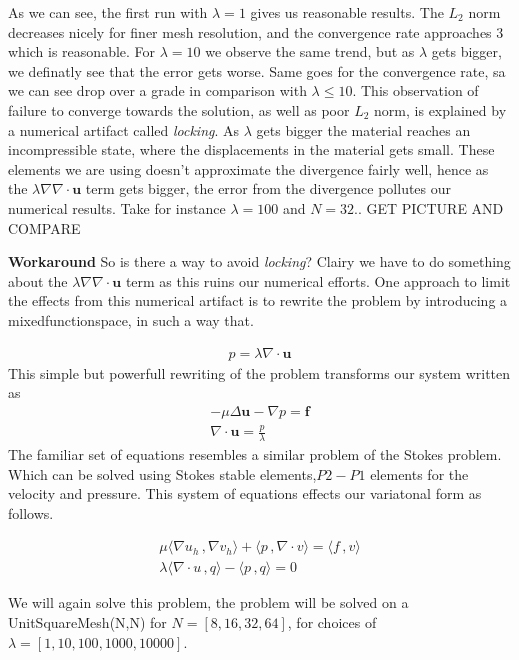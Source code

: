 \documentclass[a4paper,norsk]{article}
\begin{document}
As we can see, the first run with $\lambda = 1$ gives us reasonable results. The $L_2$ norm decreases nicely for finer mesh
resolution, and the convergence rate approaches 3 which is reasonable. For $\lambda = 10$ we observe the same trend, but as $\lambda$ gets bigger, we definatly see that the error gets worse. Same goes for the convergence rate, sa we can see drop over 
a grade in comparison with $\lambda \leq 10$. This observation of failure to converge towards the solution, as well as poor $L_2$ norm, is explained by a numerical artifact called \textit{locking}. As $\lambda$ gets bigger the material reaches an 
incompressible state, where the displacements in the material gets small.
These elements we are using doesn't approximate the divergence fairly well, hence as the 
$\lambda \nabla \nabla \cdot \textbf{u}$ term gets bigger, the error from the divergence pollutes our numerical results. Take for 
instance $\lambda = 100$ and $N = 32$.. GET PICTURE AND COMPARE


\textbf{Workaround}
So is there a way to avoid \textit{locking}? Clairy we have to do something about the $\lambda \nabla \nabla \cdot \textbf{u}$ term as this ruins our numerical efforts.
One approach to limit the effects from this numerical artifact is to rewrite
the problem by introducing a mixedfunctionspace, in such a way that.

\begin{align*}
p =  \lambda \nabla \cdot \textbf{u} 
\end{align*}
This simple but powerfull rewriting of the problem transforms our system written as
\begin{align*}
-\mu \Delta \textbf{u} - \nabla p = \textbf{f} \\
\nabla \cdot \textbf{u} = \frac{p}{\lambda}
\end{align*}
The familiar set of equations resembles a similar problem of the Stokes problem. Which
can be solved using Stokes stable elements,$P2-P1$ elements for the velocity and
pressure. This system of equations effects our variatonal form as follows.

\begin{align*}
\mu \langle \nabla u_h \,, \nabla v_h \rangle + \langle p \,, \nabla \cdot v \rangle = \langle f \,, v \rangle \\
\lambda \langle \nabla \cdot u \,, q \rangle - \langle p \,, q \rangle = 0
\end{align*}
 
We will again solve this problem, the problem will be solved on a UnitSquareMesh(N,N) for $N = [8, 16, 32, 64]$, for 
choices of $\lambda = [1, 10, 100, 1000, 10000]$. 
\end{document}
